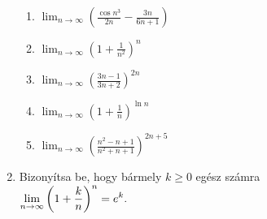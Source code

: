 \documentclass[a4paper, 12pt]{scrartcl}
\begin{document}
\begin{enumerate}
\begin{multicols}{2}
\begin{enumerate}
            \item $\displaystyle
                    \lim_{n \rightarrow \infty} \left(
                    \frac{\cos n^3}{2n} - \frac{3n}{6n+1}
                    \right)
                  $

            \item $\displaystyle
                    \lim_{n \rightarrow \infty} \left(
                    1 + \frac{1}{n^2}
                    \right)^n
                  $

            \item $\displaystyle
                    \lim_{n \rightarrow \infty} \left(
                    \frac{3n - 1}{3n + 2}
                    \right)^{2n}
                  $

            \item $\displaystyle
                    \lim_{n \rightarrow \infty} \left(
                    1 + \frac{1}{n}
                    \right)^{\ln n}
                  $

            \item $\displaystyle
                    \lim_{n \rightarrow \infty} \left(
                    \frac{n^2 - n + 1}{n^2 + n + 1}
                    \right)^{2n + 5}
                  $
          \end{enumerate}
        \end{multicols}

  \item Bizonyítsa be, hogy bármely $k \geq 0$ egész számra
        \\[3mm]
        $\displaystyle
          \lim_{n \rightarrow \infty} \left(
          1 + \frac{k}{n}
          \right)^n = e^k
          \text.
        $
\end{enumerate}

\end{document}
